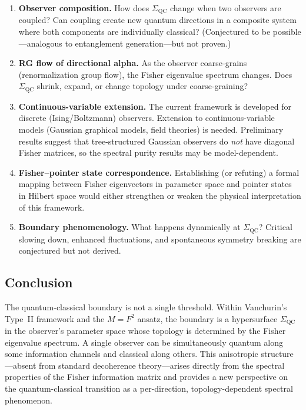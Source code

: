\documentclass[11pt,a4paper]{article}
\theoremstyle{plain}
\theoremstyle{definition}
\newcommand{\SigmaQC}{\Sigma_{\mathrm{QC}}}
\begin{document}
\begin{enumerate}[noitemsep]
\item \textbf{Observer composition.}
  How does $\SigmaQC$ change when two observers are coupled?
  Can coupling create new quantum directions in a composite
  system where both components are individually classical?
  (Conjectured to be possible---analogous to entanglement
  generation---but not proven.)

\item \textbf{RG flow of directional alpha.}
  As the observer coarse-grains (renormalization group flow),
  the Fisher eigenvalue spectrum changes.  Does $\SigmaQC$
  shrink, expand, or change topology under coarse-graining?

\item \textbf{Continuous-variable extension.}
  The current framework is developed for discrete (Ising/Boltzmann)
  observers.  Extension to continuous-variable models (Gaussian
  graphical models, field theories) is needed.  Preliminary
  results suggest that tree-structured Gaussian observers do
  \emph{not} have diagonal Fisher matrices, so the spectral
  purity results may be model-dependent.

\item \textbf{Fisher--pointer state correspondence.}
  Establishing (or refuting) a formal mapping between Fisher
  eigenvectors in parameter space and pointer states in Hilbert
  space would either strengthen or weaken the physical
  interpretation of this framework.

\item \textbf{Boundary phenomenology.}
  What happens dynamically at $\SigmaQC$?  Critical slowing
  down, enhanced fluctuations, and spontaneous symmetry breaking
  are conjectured but not derived.
\end{enumerate}


\subsection{Conclusion}

The quantum-classical boundary is not a single threshold.
Within Vanchurin's Type~II framework and the $M = F^2$ ansatz,
the boundary is a hypersurface $\SigmaQC$ in the observer's
parameter space whose topology is determined by the Fisher
eigenvalue spectrum.  A single observer can be simultaneously
quantum along some information channels and classical along
others.  This anisotropic structure---absent from standard
decoherence theory---arises directly from the spectral properties
of the Fisher information matrix and provides a new perspective
on the quantum-classical transition as a per-direction,
topology-dependent spectral phenomenon.
\end{document}
